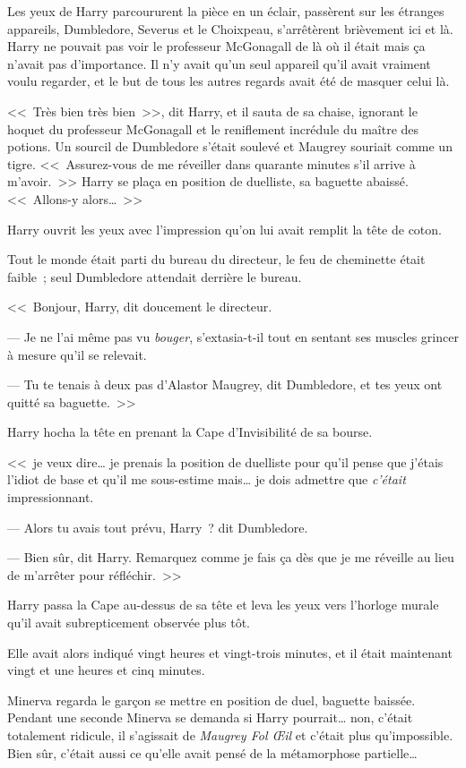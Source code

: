 Les yeux de Harry parcoururent la pièce en un éclair, passèrent sur les étranges appareils, Dumbledore, Severus et le Choixpeau, s'arrêtèrent brièvement ici et là. Harry ne pouvait pas voir le professeur McGonagall de là où il était mais ça n'avait pas d'importance. Il n'y avait qu'un seul appareil qu'il avait vraiment voulu regarder, et le but de tous les autres regards avait été de masquer celui là.

<<~Très bien très bien~>>, dit Harry, et il sauta de sa chaise, ignorant le hoquet du professeur McGonagall et le reniflement incrédule du maître des potions. Un sourcil de Dumbledore s'était soulevé et Maugrey souriait comme un tigre. <<~Assurez-vous de me réveiller dans quarante minutes s'il arrive à m'avoir.~>> Harry se plaça en position de duelliste, sa baguette abaissé. <<~Allons-y alors…~>>

\later

Harry ouvrit les yeux avec l'impression qu'on lui avait remplit la tête de coton.

Tout le monde était parti du bureau du directeur, le feu de cheminette était faible~; seul Dumbledore attendait derrière le bureau.

<<~Bonjour, Harry, dit doucement le directeur.

--- Je ne l'ai même pas vu \emph{bouger}, s'extasia-t-il tout en sentant ses muscles grincer à mesure qu'il se relevait.

--- Tu te tenais à deux pas d'Alastor Maugrey, dit Dumbledore, et tes yeux ont quitté sa baguette.~>>

Harry hocha la tête en prenant la Cape d'Invisibilité de sa bourse.

<<~je veux dire… je prenais la position de duelliste pour qu'il pense que j'étais l'idiot de base et qu'il me sous-estime mais… je dois admettre que \emph{c'était} impressionnant.

--- Alors tu avais tout prévu, Harry~? dit Dumbledore.

--- Bien sûr, dit Harry. Remarquez comme je fais ça dès que je me réveille au lieu de m'arrêter pour réfléchir.~>>

Harry passa la Cape au-dessus de sa tête et leva les yeux vers l'horloge murale qu'il avait subrepticement observée plus tôt.

Elle avait alors indiqué vingt heures et vingt-trois minutes, et il était maintenant vingt et une heures et cinq minutes.

\later

Minerva regarda le garçon se mettre en position de duel, baguette baissée. Pendant une seconde Minerva se demanda si Harry pourrait… non, c'était totalement ridicule, il s'agissait de \emph{Maugrey Fol Œil} et c'était plus qu'impossible. Bien sûr, c'était aussi ce qu'elle avait pensé de la métamorphose partielle…

